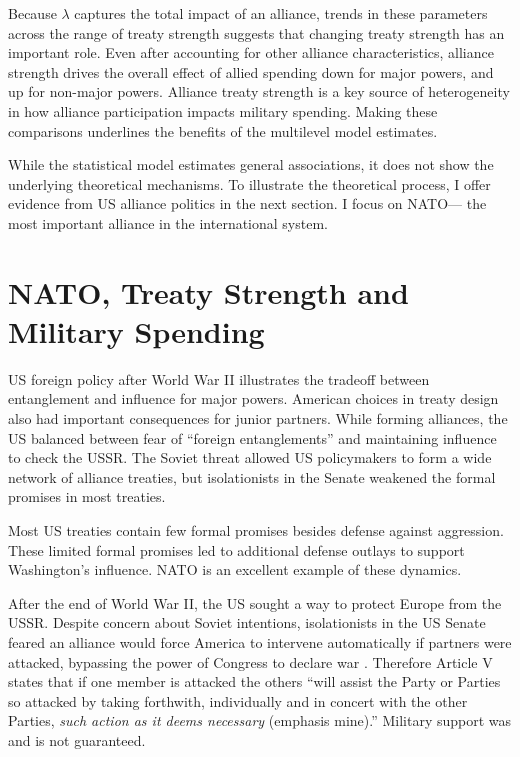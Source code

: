 \documentclass[12pt]{article}
\begin{document}
Because $\lambda$ captures the total impact of an alliance, trends in these parameters across the range of treaty strength suggests that changing treaty strength has an important role. 
Even after accounting for other alliance characteristics, alliance strength drives the overall effect of allied spending down for major powers, and up for non-major powers. 
Alliance treaty strength is a key source of heterogeneity in how alliance participation impacts military spending. 
Making these comparisons underlines the benefits of the multilevel model estimates. 


While the statistical model estimates general associations, it does not show the underlying theoretical mechanisms. 
To illustrate the theoretical process, I offer evidence from US alliance politics in the next section.  
I focus on NATO--- the most important alliance in the international system. 


\section{NATO, Treaty Strength and Military Spending}


US foreign policy after World War II illustrates the tradeoff between entanglement and influence for major powers.
American choices in treaty design also had important consequences for junior partners. 
While forming alliances, the US balanced between fear of ``foreign entanglements'' and maintaining influence to check the USSR.
The Soviet threat allowed US policymakers to form a wide network of alliance treaties, but isolationists in the Senate weakened the formal promises in most treaties. 


Most US treaties contain few formal promises besides defense against aggression. 
These limited formal promises led to additional defense outlays to support Washington's influence.  
NATO is an excellent example of these dynamics. 


After the end of World War II, the US sought a way to protect Europe from the USSR. 
Despite concern about Soviet intentions, isolationists in the US Senate feared an alliance would force America to intervene automatically if partners were attacked, bypassing the power of Congress to declare war \citep[pg. 280-1]{Acheson1969}.
Therefore Article V states that if one member is attacked the others ``will assist the Party or Parties so attacked by taking forthwith, individually and in concert with the other Parties, \emph{such action as it deems necessary} (emphasis mine).'' 
Military support was and is not guaranteed. 
\end{document}
